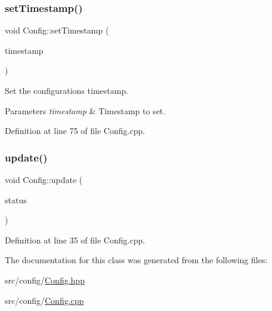\subsubsection{\texorpdfstring{set\+Timestamp()}{setTimestamp()}}
{\footnotesize\ttfamily void Config\+::set\+Timestamp (\begin{DoxyParamCaption}\item[{const \hyperlink{namespacecfg_aa17d58439174a5af7fb3f37a3cdd6d0b}{Timestamp} \&}]{timestamp }\end{DoxyParamCaption})}



Set the configuration\textquotesingle{}s timestamp. 


\begin{DoxyParams}{Parameters}
{\em timestamp} & Timestamp to set. \\
\hline
\end{DoxyParams}


Definition at line 75 of file Config.\+cpp.

\mbox{\label{classcfg_1_1_config_a622ad4331306ae232060ef6e74fe8134}} 
\subsubsection{\texorpdfstring{update()}{update()}}
{\footnotesize\ttfamily void Config\+::update (\begin{DoxyParamCaption}\item[{const \hyperlink{namespacecfg_a384f743959a9029f7e1c3d11548795de}{File\+Status} \&}]{status }\end{DoxyParamCaption})}



Definition at line 35 of file Config.\+cpp.



The documentation for this class was generated from the following files\+:\begin{DoxyCompactItemize}
\item 
src/config/\hyperlink{_config_8hpp}{Config.\+hpp}\item 
src/config/\hyperlink{_config_8cpp}{Config.\+cpp}\end{DoxyCompactItemize}

